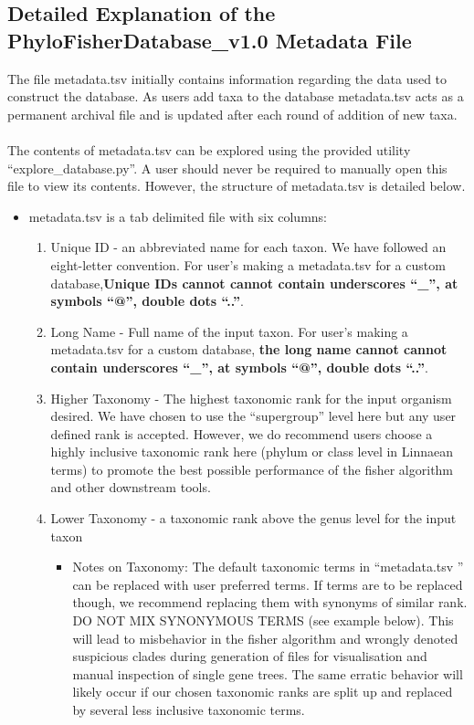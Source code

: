 \documentclass{article}
\begin{document}
    \subsection{Detailed Explanation of the PhyloFisherDatabase\_v1.0 Metadata File}
    \label{sec:metadata}    
     The file metadata.tsv initially contains information regarding the data used to construct the database. As users add taxa to the database metadata.tsv acts as a permanent archival file and is updated after each round of addition of new taxa.  
     \\\\
     The contents of metadata.tsv can be explored using the provided utility “explore\_database.py”. A user should never be required to manually open this file to view its contents. However, the structure of metadata.tsv is detailed below.
    \begin{itemize}
        \item metadata.tsv is a tab delimited file with six columns:
            \begin{enumerate}
                \item Unique ID - an abbreviated name for each taxon. We have followed an eight-letter convention. For user's making a metadata.tsv for a custom database,\textbf{Unique IDs cannot cannot contain underscores “\_”, at symbols “@”, double dots “..”}.
                \item Long Name - Full name of the input taxon. For user's making a metadata.tsv for a custom database, \textbf{the long name cannot cannot contain underscores “\_”, at symbols “@”, double dots “..”}.
                \item Higher Taxonomy - The highest taxonomic rank for the input organism desired. We have chosen to use the “supergroup” level here but any user defined rank is accepted. However, we do recommend users choose a highly inclusive taxonomic rank here (phylum or class level in Linnaean terms) to promote the best possible performance of  the fisher algorithm and other downstream tools. 
                \item Lower Taxonomy - a taxonomic rank above the genus level for the input taxon
                    \begin{itemize}
                        \item Notes on Taxonomy: The default taxonomic terms in “metadata.tsv ” can be replaced with user preferred terms. If terms are to be replaced though, we recommend replacing them with synonyms of similar rank. DO NOT MIX SYNONYMOUS TERMS (see example below). This will lead to misbehavior in the fisher algorithm and wrongly denoted suspicious clades during generation of files for visualisation and manual inspection of single gene trees. The same erratic behavior will likely occur if our chosen taxonomic ranks are split up and replaced by several less inclusive taxonomic terms.

\end{itemize}
\end{enumerate}
\end{itemize}
\end{document}
